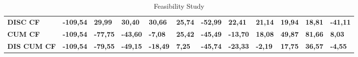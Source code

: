 \begin{landscape}
\begin{table}[]
{\begin{tabular}{| l |l|l|l|l|l|l|l|l|l|l|l|}
\rowcolor[gray]{0.85}
\textbf{DISC CF}                                                                       & \textbf{-109,54} & \textbf{29,99}  & \textbf{30,40}  & \textbf{30,66}  & \textbf{25,74}  & \textbf{-52,99}  & \textbf{22,41}  & \textbf{21,14}  & \textbf{19,94}  & \textbf{18,81}  & \textbf{-41,11} \\
\rowcolor[gray]{0.85}
\textbf{CUM CF}                                                                        & \textbf{-109,54} & \textbf{-77,75} & \textbf{-43,60} & \textbf{-7,08}  & \textbf{25,42}  & \textbf{-45,49}  & \textbf{-13,70} & \textbf{18,08}  & \textbf{49,87}  & \textbf{81,66}  & \textbf{8,03}   \\
\rowcolor[gray]{0.85}
\textbf{DIS CUM CF}                                                                    & \textbf{-109,54} & \textbf{-79,55} & \textbf{-49,15} & \textbf{-18,49} & \textbf{7,25}   & \textbf{-45,74}  & \textbf{-23,33} & \textbf{-2,19}  & \textbf{17,75}  & \textbf{36,57}  & \textbf{-4,55}  \\ \hline
\end{tabular}
}
\vspace*{\fill}
\caption{Feasibility Study}
\label{Feasibility Study}
\end{table}
\end{landscape}
\restoregeometry
